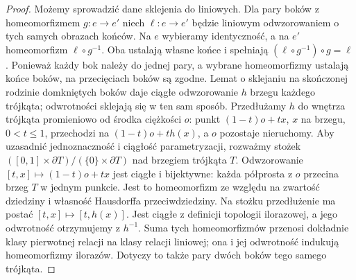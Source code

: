 \begin{proof}
Możemy sprowadzić dane sklejenia do liniowych.
Dla pary boków z homeomorfizmem $g:e\to e'$
niech $\ell:e\to e'$ będzie liniowym odwzorowaniem
o tych samych obrazach końców. Na $e$ wybieramy
identyczność, a na $e'$ homeomorfizm
$\ell\circ g^{-1}$. Oba ustalają własne końce
i spełniają $(\ell\circ g^{-1})\circ g=\ell$.
Ponieważ każdy bok należy do jednej pary,
a wybrane homeomorfizmy ustalają końce boków,
na przecięciach boków są zgodne. Lemat o sklejaniu
na skończonej rodzinie domkniętych boków daje
ciągłe odwzorowanie $h$ brzegu każdego trójkąta;
odwrotności sklejają się w ten sam sposób.
Przedłużamy $h$ do wnętrza trójkąta promieniowo
od środka ciężkości $o$: punkt
$(1-t)o+tx$, $x$ na brzegu, $0<t\le1$,
przechodzi na $(1-t)o+th(x)$, a $o$ pozostaje
nieruchomy. Aby uzasadnić jednoznaczność i ciągłość
parametryzacji, rozważmy stożek
$([0,1]\times\partial T)/(\{0\}\times\partial T)$
nad brzegiem trójkąta $T$. Odwzorowanie
$[t,x]\mapsto (1-t)o+tx$ jest ciągłe i bijektywne:
każda półprosta z $o$ przecina brzeg $T$ w jednym
punkcie. Jest to homeomorfizm ze względu na zwartość
dziedziny i własność Hausdorffa przeciwdziedziny.
Na stożku przedłużenie ma postać $[t,x]\mapsto[t,h(x)]$.
Jest ciągłe z definicji topologii ilorazowej,
a jego odwrotność otrzymujemy z $h^{-1}$. Suma tych homeomorfizmów
przenosi dokładnie klasy pierwotnej relacji na klasy
relacji liniowej; ona i jej odwrotność indukują
homeomorfizmy ilorazów. Dotyczy to także pary
dwóch boków tego samego trójkąta.


\end{proof}
